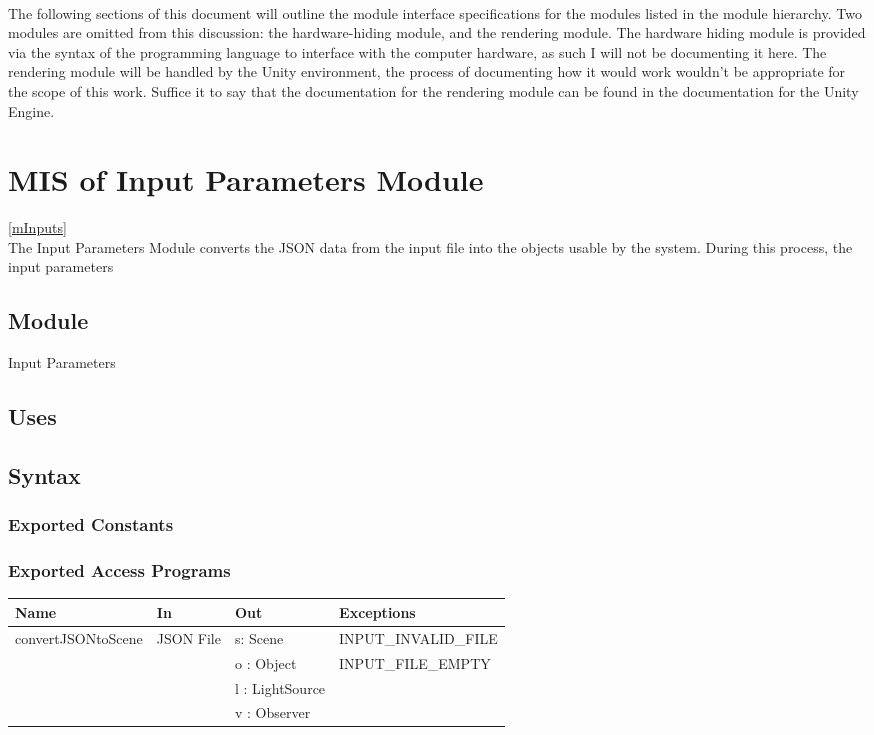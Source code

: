 \documentclass[12pt, titlepage]{article}
\begin{document}
~\newpage

The following sections of this document will outline the module interface 
specifications for the modules listed in the module hierarchy. Two modules are 
omitted from this discussion: the hardware-hiding module, and the rendering 
module. The hardware hiding module is provided via the syntax of the 
programming language to interface with the computer hardware, as such I will 
not be documenting it here. The rendering module will be handled by the Unity 
environment, the process of documenting how it would work wouldn't be 
appropriate for the scope of this work. Suffice it to say that the 
documentation for the rendering module can be found in the documentation for 
the Unity Engine.

\section{MIS of Input Parameters Module} \ref{mInputs} \\
The Input Parameters Module converts the JSON data from the input file into the 
objects usable by the system. During this process, the input parameters 

\subsection{Module}
Input Parameters

\subsection{Uses}

\subsection{Syntax}
\subsubsection{Exported Constants}

\subsubsection{Exported Access Programs}
\begin{center}
	\begin{tabular}{p{4cm} p{2cm} p{2cm} p{4cm}}
		\hline
		\textbf{Name} & \textbf{In} & \textbf{Out} & \textbf{Exceptions} \\
		\hline
		\multirow{4}{*}{convertJSONtoScene} & \multirow{4}{2cm}{JSON File} & s: 
		Scene & INPUT\_INVALID\_FILE\\
		& & o : Object & INPUT\_FILE\_EMPTY\\
		& & l : LightSource & \\
		& & v : Observer & \\
		\hline
	\end{tabular}
\end{center}
\end{document}
